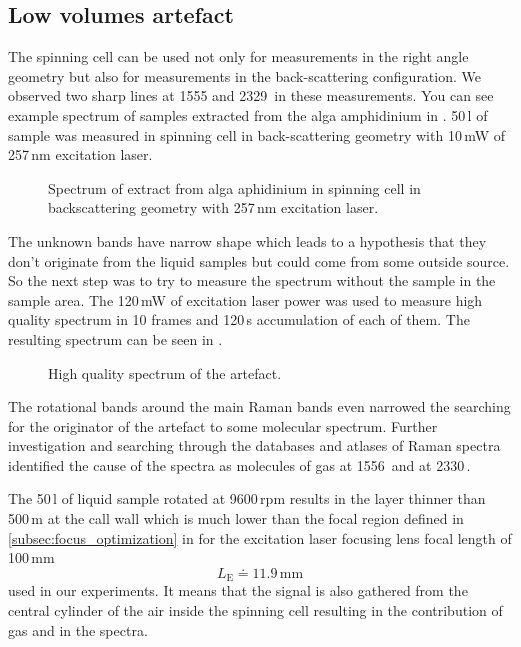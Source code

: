 \subsection{Low volumes artefact}

The spinning cell can be used not only for measurements in the right angle
geometry but also for measurements in the back-scattering configuration.
We observed two sharp lines at 1555 and 2329\,\icm{} in these measurements.
You can see example spectrum of samples extracted from the alga amphidinium in
.
50\,l of sample was measured in spinning cell in back-scattering geometry
with 10\,mW of 257\,nm excitation laser.

\begin{figure}
	\centering
	
	\caption{Spectrum of extract from alga aphidinium in spinning cell in
		backscattering geometry with 257\,nm excitation laser.}
	\label{\figlabel{artefact:artefact_amphidinium}}
\end{figure}

The unknown bands have narrow shape which leads to a hypothesis that they
don't originate from the liquid samples but could come from some outside
source. So the next step was to try to measure the spectrum without the
sample in the sample area. The 120\,mW of excitation laser power was used to
measure high quality spectrum in 10 frames and 120\,s accumulation of each of
them. The resulting spectrum can be seen in
.

\begin{figure}
	\centering
	
	\caption{High quality spectrum of the artefact.}
	\label{\figlabel{artefact:artefact}}
\end{figure}

The rotational bands around the main Raman bands even narrowed the searching
for the originator of the artefact to some molecular spectrum. Further
investigation and searching through the databases and atlases of Raman spectra
identified the cause of the spectra as molecules of gas  at 1556\,\icm{}
and  at 2330\,\icm{}.

The 50\,l of liquid sample rotated at 9600\,rpm results in the layer
thinner than 500\,m at the call wall which is much lower than the focal
region defined in
\cref{subsec:focus_optimization}
in
for the excitation laser focusing lens focal length of 100\,mm
\begin{equation*}
L_\text{E} \doteq 11.9\,\text{mm}
\end{equation*}
used in our experiments.
It means that the signal is also gathered from the central cylinder of the air
inside the spinning cell resulting in the contribution of gas  and
 in the spectra.
